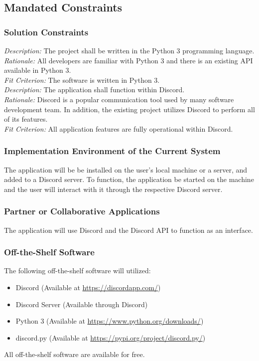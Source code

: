 \documentclass[12pt, titlepage]{article}
\begin{document}
\subsection{Mandated Constraints}
\subsubsection{Solution Constraints}
\noindent \textit{Description:} The project shall be written in the Python 3 programming language.\\
\textit{Rationale:} All developers are familiar with Python 3 and there is an existing API available in Python 3.\\
\textit{Fit Criterion:} The software is written in Python 3.\\

\noindent \textit{Description:} The application shall function within Discord.\\
\textit{Rationale:} Discord is a popular communication tool used by many software development team. In addition, the existing project utilizes Discord to perform all of its features.\\
\textit{Fit Criterion:} All application features are fully operational within Discord.

\subsubsection{Implementation Environment of the Current System}
The application will be be installed on the user's local machine or a server, and added to a Discord server. To function, the application be started on the machine and the user will interact with it through the respective Discord server.

\subsubsection{Partner or Collaborative Applications}
The application will use Discord and the Discord API to function as an interface.

\subsubsection{Off-the-Shelf Software}
The following off-the-shelf software will utilized:
\begin{itemize}
    \item Discord (Available at \url{https://discordapp.com/})
    \item Discord Server (Available through Discord)
    \item Python 3 (Available at \url{https://www.python.org/downloads/})
    \item discord.py (Available at \url{https://pypi.org/project/discord.py/})
\end{itemize}
All off-the-shelf software are available for free.
\end{document}
